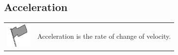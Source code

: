     
    
    
    
    
  
    \label{m38794*cid6}
            \subsection{ Acceleration}
            \nopagebreak
            \par
            \label{m38794*fhsst!!!underscore!!!id1326}\begin{definition}
	  \begin{tabular*}{15 cm}{m{15 mm}m{}}
	\hspace*{-50pt}  \includegraphics[width=0.5in]{col11305.imgs/psflag2.png}   & \Definition{   \label{id2531677}\textbf{ Acceleration }} { \label{m38794*meaningfhsst!!!underscore!!!id1326}
      \label{m38794*id67550}Acceleration is the rate of change of velocity. \par 
       } 
      \end{tabular*}
      \end{definition}


